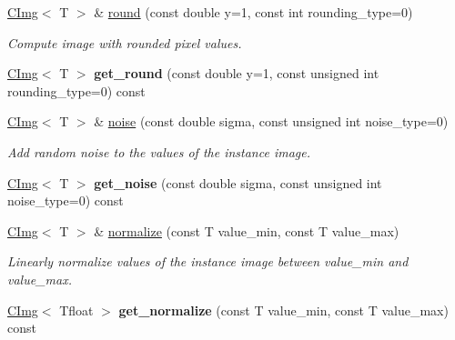 \begin{DoxyCompactItemize}
\item 
\hyperlink{structcimg__library_1_1CImg}{CImg}$<$ T $>$ \& \hyperlink{structcimg__library_1_1CImg_a8b955cb2b582511500f192aacf8a86ea}{round} (const double y=1, const int rounding\_\-type=0)
\begin{DoxyCompactList}\small\item\em Compute image with rounded pixel values. \item\end{DoxyCompactList}\item 
\hypertarget{structcimg__library_1_1CImg_aee720135c19d110387b09638dd51bf90}{
\hyperlink{structcimg__library_1_1CImg}{CImg}$<$ T $>$ {\bfseries get\_\-round} (const double y=1, const unsigned int rounding\_\-type=0) const }
\label{structcimg__library_1_1CImg_aee720135c19d110387b09638dd51bf90}

\item 
\hyperlink{structcimg__library_1_1CImg}{CImg}$<$ T $>$ \& \hyperlink{structcimg__library_1_1CImg_acaf16c667ccfe861ba7c565537f67a1a}{noise} (const double sigma, const unsigned int noise\_\-type=0)
\begin{DoxyCompactList}\small\item\em Add random noise to the values of the instance image. \item\end{DoxyCompactList}\item 
\hypertarget{structcimg__library_1_1CImg_a06964cb644890dcc424cc2ec18057780}{
\hyperlink{structcimg__library_1_1CImg}{CImg}$<$ T $>$ {\bfseries get\_\-noise} (const double sigma, const unsigned int noise\_\-type=0) const }
\label{structcimg__library_1_1CImg_a06964cb644890dcc424cc2ec18057780}

\item 
\hyperlink{structcimg__library_1_1CImg}{CImg}$<$ T $>$ \& \hyperlink{structcimg__library_1_1CImg_ab7943be99d0d4cfc6550d70039ecbf24}{normalize} (const T value\_\-min, const T value\_\-max)
\begin{DoxyCompactList}\small\item\em Linearly normalize values of the instance image between {\ttfamily value\_\-min} and {\ttfamily value\_\-max}. \item\end{DoxyCompactList}\item 
\hypertarget{structcimg__library_1_1CImg_abad26cdfbd4dc467d1840a0e532f6a5f}{
\hyperlink{structcimg__library_1_1CImg}{CImg}$<$ Tfloat $>$ {\bfseries get\_\-normalize} (const T value\_\-min, const T value\_\-max) const }
\label{structcimg__library_1_1CImg_abad26cdfbd4dc467d1840a0e532f6a5f}


\end{DoxyCompactItemize}
